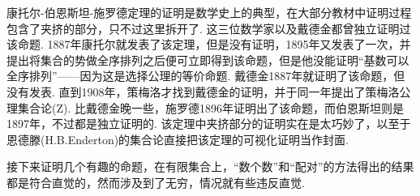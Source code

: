 \begin{note}
    康托尔-伯恩斯坦-施罗德定理的证明是数学史上的典型，在大部分教材中证明过程包含了夹挤的部分，只不过这里拆开了. 这三位数学家以及戴德金都曾独立证明过该命题. 1887年康托尔就发表了该定理，但是没有证明，1895年又发表了一次，并提出将集合的势做全序排列之后便可立即得到该命题，但是他没能证明“基数可以全序排列”——因为这是选择公理的等价命题. 戴德金1887年就证明了该命题，但没有发表. 直到1908年，策梅洛才找到戴德金的证明，并于同一年提出了策梅洛公理集合论(\textsf{Z}). 比戴德金晚一些，施罗德1896年证明出了该命题，而伯恩斯坦则是1897年，不过都是独立证明的. 该定理中夹挤部分的证明实在是太巧妙了，以至于恩德滕(H.B.Enderton)的集合论直接把该定理的可视化证明当作封面.
\end{note}

接下来证明几个有趣的命题，在有限集合上，“数个数”和“配对”的方法得出的结果都是符合直觉的，然而涉及到了无穷，情况就有些违反直觉.
